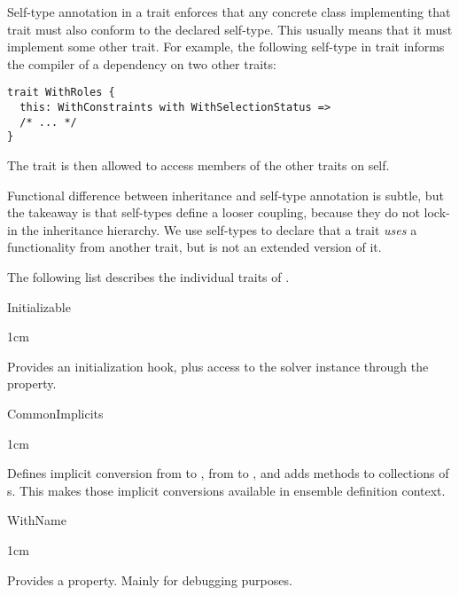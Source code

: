 Self-type annotation in a trait enforces that any concrete class implementing that trait
must also conform to the declared self-type. This usually means that it must implement
some other trait. For example, the following self-type in trait  informs
the compiler of a dependency on two other traits:
\begin{lstlisting}[style=snippet]
trait WithRoles {
  this: WithConstraints with WithSelectionStatus =>
  /* ... */
}
\end{lstlisting}

The  trait is then allowed to access members of the other traits on self.

Functional difference between inheritance and self-type annotation is subtle, but the
takeaway is that self-types define a looser coupling, because they do not lock-in the
inheritance hierarchy. We use self-types to declare that a trait \textit{uses} a
functionality from another trait, but is not an extended version of it.

\medskip

The following list describes the individual traits of .

\newenvironment{trait}[1]%
    {%
        \par\vspace{0.6em}
        {\bfseries\ttfamily\raggedright\large#1}
        \setlength{\parindent}{0em}
        \setlength{\parskip}{0.3em}
        \begin{adjustwidth}{1cm}{}
    }%
    {%
        \end{adjustwidth}
    }%

\pagebreak

\begin{trait}{Initializable}
    Provides an initialization hook, plus access to the solver instance through the
     property.
\end{trait}

\begin{trait}{CommonImplicits}
    Defines implicit conversion from  to , from  to
    , and adds methods to collections of s. This makes those
    implicit conversions available in ensemble definition context.
\end{trait}

\begin{trait}{WithName}
    Provides a  property. Mainly for debugging purposes.
\end{trait}

